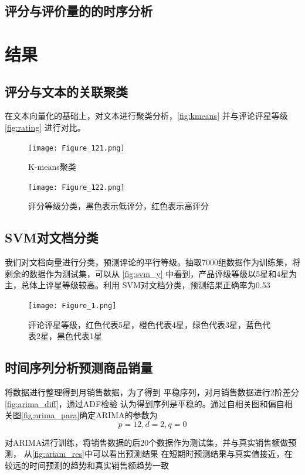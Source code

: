 \section{评分与评价量的的时序分析}

\chapter{结果}

\section{评分与文本的关联聚类}
在文本向量化的基础上，对文本进行聚类分析，\autoref{fig:kmeans} 
并与评论评星等级\autoref{fig:rating} 进行对比。

\begin{figure}
    \centering
    \texttt{[image: Figure\_121.png]}
    \caption{K-means聚类}
    \label{fig:kmeans}
\end{figure}


\begin{figure}
    \centering
    \texttt{[image: Figure\_122.png]}
    \caption{评分等级分类，黑色表示低评分，红色表示高评分}
    \label{fig:rating}
\end{figure}

\section{SVM对文档分类}

我们对文档向量进行分类，预测评论的平行等级。抽取7000组数据作为训练集，将剩余的数据作为测试集，可以从
\autoref{fig:svm_y} 中看到，产品评级等级以5星和4星为主，总体上评星等级较高。利用
SVM对文档分类，预测结果正确率为0.53
\begin{figure}
    \centering
    \texttt{[image: Figure\_1.png]}
    \caption{评论评星等级，红色代表5星，橙色代表4星，绿色代表3星，蓝色代表2星，黑色代表1星}
    \label{fig:svm_y}
\end{figure}

\section{时间序列分析预测商品销量}

将数据进行整理得到月销售数据，为了得到
平稳序列，对月销售数据进行2阶差分\autoref{fig:arima_diff}，通过ADF检验
认为得到序列是平稳的。通过自相关图和偏自相关图\autoref{fig:arima_para}确定ARIMA的参数为
$$
    p=12,d=2,q=0
$$

对ARIMA进行训练，将销售数据的后20个数据作为测试集，并与真实销售额做预测， 从\autoref{fig:ariam_res}中可以看出预测结果
在短期时预测结果与真实值接近，在较远的时间预测的趋势和真实销售额趋势一致

